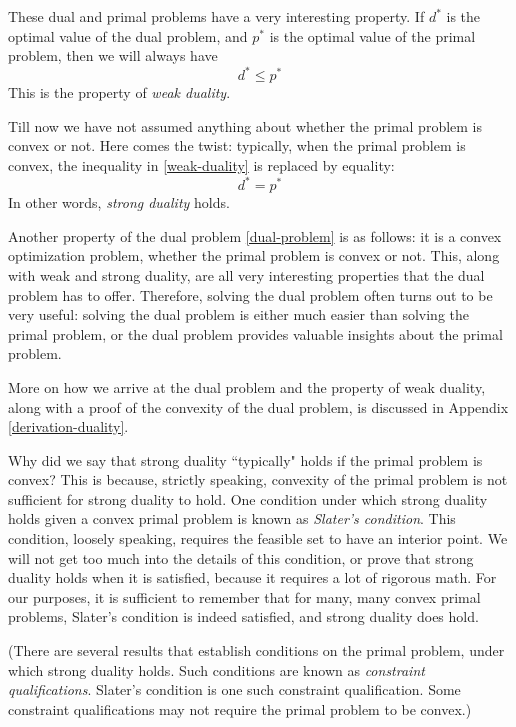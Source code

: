 \documentclass[a4paper]{article}
\theoremstyle{definition}
\begin{document}
These dual and primal problems have a very interesting property. If $d^*$ is the optimal value of the dual problem, and $p^*$ is the optimal value of the primal problem, then we will always have
\begin{equation}
	\label{weak-duality}
	d^* \leq p^*
\end{equation}
This is the property of \textit{weak duality}.

Till now we have not assumed anything about whether the primal problem is convex or not.
Here comes the twist: typically, when the primal problem is convex, the inequality in \eqref{weak-duality} is replaced by equality:
\begin{equation}
	\label{strong-duality}
	d^* = p^*
\end{equation}
In other words, \textit{strong duality} holds.

Another property of the dual problem \eqref{dual-problem} is as follows: it is a convex optimization problem, whether the primal problem is convex or not.
This, along with weak and strong duality, are all very interesting properties that the dual problem has to offer.
Therefore, solving the dual problem often turns out to be very useful: solving the dual problem is either much easier than solving the primal problem, or the dual problem provides valuable insights about the primal problem.

More on how we arrive at the dual problem and the property of weak duality, along with a proof of the convexity of the dual problem, is discussed in Appendix \ref{derivation-duality}.

Why did we say that strong duality ``typically" holds if the primal problem is convex?
This is because, strictly speaking, convexity of the primal problem is not sufficient for strong duality to hold.
One condition under which strong duality holds given a convex primal problem is known as \textit{Slater's condition}.
This condition, loosely speaking, requires the feasible set to have an interior point.
We will not get too much into the details of this condition, or prove that strong duality holds when it is satisfied, because it requires a lot of rigorous math.
For our purposes, it is sufficient to remember that for many, many convex primal problems, Slater's condition is indeed satisfied, and strong duality does hold.

(There are several results that establish conditions on the primal problem, under which strong duality holds.
Such conditions are known as \textit{constraint qualifications}.
Slater's condition is one such constraint qualification.
Some constraint qualifications may not require the primal problem to be convex.)
\end{document}
